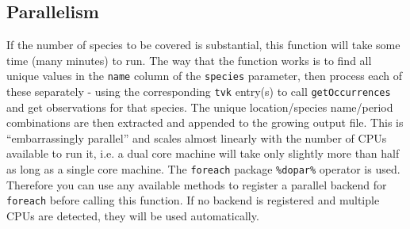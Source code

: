 \documentclass{article}
\begin{document}
\subsection{Parallelism}
If the number of species to be covered is 
substantial, this function will take some time (many minutes) to run. The way
that the function works is to find all unique values in the \texttt{name} 
column of the \texttt{species} parameter, then process each of these separately
- using the corresponding \texttt{tvk} entry(s) to call 
\texttt{getOccurrences} and get observations for that species. The
unique location/species name/period combinations are then extracted and
appended to the growing output file. This is ``embarrassingly parallel'' and
scales almost linearly with the number of CPUs available to run it, i.e. a
dual core machine will take only slightly more than half as long as a single
core machine. The \texttt{foreach} package \texttt{\%dopar\%} operator is used.
Therefore you can use any available methods to register a parallel backend
for \texttt{foreach} before calling this function. If no backend is registered
and multiple CPUs are detected, they will be used automatically.


\end{document}
